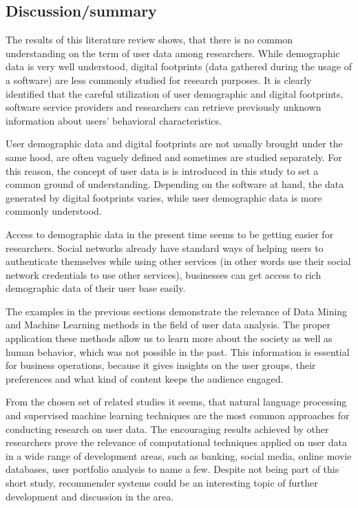 \subsection{Discussion/summary}
The results of this literature review shows, that there is no common understanding on the term of user data among researchers. While demographic data is very well understood, digital footprints (data gathered during the usage of a software) are less commonly studied for research purposes. It is clearly identified that the careful utilization of user demographic and digital footprints, software service providers and researchers can retrieve previously unknown information about users' behavioral characteristics. 

User demographic data and digital footprints are not usually brought under the same hood, are often vaguely defined and sometimes are studied separately. For this reason, the concept of user data is is introduced in this study to set a common ground of understanding. Depending on the software at hand, the data generated by digital footprints varies, while user demographic data is more commonly understood. 

Access to demographic data in the present time seems to be getting easier for researchers. Social networks already have standard ways of helping users to authenticate themselves while using other services (in other words use their social network credentials to use other services), businesses can get access to rich demographic data of their user base easily. 

The examples in the previous sections demonstrate the relevance of Data Mining and Machine Learning methods in the field of user data analysis. The proper application these methods allow us to learn more about the society as well as human behavior, which was not possible in the past. This information is essential for business operations, because it gives insights on the user groups, their preferences and what kind of content keeps the audience engaged. 

From the chosen set of related studies it seems, that natural language processing and supervised machine learning techniques are the most common approaches for conducting research on user data. The encouraging results achieved by other researchers prove the relevance of computational techniques applied on user data in a wide range of development areas, such as banking, social media, online movie databases, user portfolio analysis to name a few. Despite not being part of this short study, recommender systems could be an interesting topic of further development and discussion in the area.

